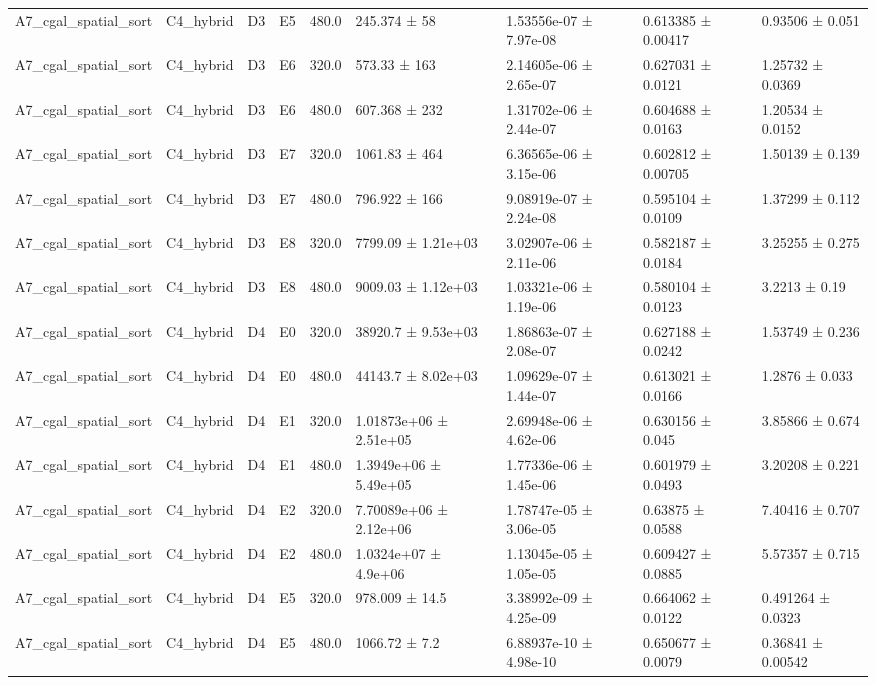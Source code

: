 \begin{table}
\begin{tabular}{lllllllll}
A7\_cgal\_spatial\_sort & C4\_hybrid & D3 & E5 & 480.0 & 245.374 ± 58 & 1.53556e-07 ± 7.97e-08 & 0.613385 ± 0.00417 & 0.93506 ± 0.051 \\
A7\_cgal\_spatial\_sort & C4\_hybrid & D3 & E6 & 320.0 & 573.33 ± 163 & 2.14605e-06 ± 2.65e-07 & 0.627031 ± 0.0121 & 1.25732 ± 0.0369 \\
A7\_cgal\_spatial\_sort & C4\_hybrid & D3 & E6 & 480.0 & 607.368 ± 232 & 1.31702e-06 ± 2.44e-07 & 0.604688 ± 0.0163 & 1.20534 ± 0.0152 \\
A7\_cgal\_spatial\_sort & C4\_hybrid & D3 & E7 & 320.0 & 1061.83 ± 464 & 6.36565e-06 ± 3.15e-06 & 0.602812 ± 0.00705 & 1.50139 ± 0.139 \\
A7\_cgal\_spatial\_sort & C4\_hybrid & D3 & E7 & 480.0 & 796.922 ± 166 & 9.08919e-07 ± 2.24e-08 & 0.595104 ± 0.0109 & 1.37299 ± 0.112 \\
A7\_cgal\_spatial\_sort & C4\_hybrid & D3 & E8 & 320.0 & 7799.09 ± 1.21e+03 & 3.02907e-06 ± 2.11e-06 & 0.582187 ± 0.0184 & 3.25255 ± 0.275 \\
A7\_cgal\_spatial\_sort & C4\_hybrid & D3 & E8 & 480.0 & 9009.03 ± 1.12e+03 & 1.03321e-06 ± 1.19e-06 & 0.580104 ± 0.0123 & 3.2213 ± 0.19 \\
A7\_cgal\_spatial\_sort & C4\_hybrid & D4 & E0 & 320.0 & 38920.7 ± 9.53e+03 & 1.86863e-07 ± 2.08e-07 & 0.627188 ± 0.0242 & 1.53749 ± 0.236 \\
A7\_cgal\_spatial\_sort & C4\_hybrid & D4 & E0 & 480.0 & 44143.7 ± 8.02e+03 & 1.09629e-07 ± 1.44e-07 & 0.613021 ± 0.0166 & 1.2876 ± 0.033 \\
A7\_cgal\_spatial\_sort & C4\_hybrid & D4 & E1 & 320.0 & 1.01873e+06 ± 2.51e+05 & 2.69948e-06 ± 4.62e-06 & 0.630156 ± 0.045 & 3.85866 ± 0.674 \\
A7\_cgal\_spatial\_sort & C4\_hybrid & D4 & E1 & 480.0 & 1.3949e+06 ± 5.49e+05 & 1.77336e-06 ± 1.45e-06 & 0.601979 ± 0.0493 & 3.20208 ± 0.221 \\
A7\_cgal\_spatial\_sort & C4\_hybrid & D4 & E2 & 320.0 & 7.70089e+06 ± 2.12e+06 & 1.78747e-05 ± 3.06e-05 & 0.63875 ± 0.0588 & 7.40416 ± 0.707 \\
A7\_cgal\_spatial\_sort & C4\_hybrid & D4 & E2 & 480.0 & 1.0324e+07 ± 4.9e+06 & 1.13045e-05 ± 1.05e-05 & 0.609427 ± 0.0885 & 5.57357 ± 0.715 \\
A7\_cgal\_spatial\_sort & C4\_hybrid & D4 & E5 & 320.0 & 978.009 ± 14.5 & 3.38992e-09 ± 4.25e-09 & 0.664062 ± 0.0122 & 0.491264 ± 0.0323 \\
A7\_cgal\_spatial\_sort & C4\_hybrid & D4 & E5 & 480.0 & 1066.72 ± 7.2 & 6.88937e-10 ± 4.98e-10 & 0.650677 ± 0.0079 & 0.36841 ± 0.00542 \\

\end{tabular}
\end{table}
